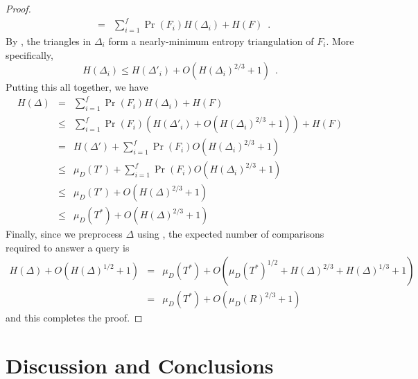 \documentclass[lotsofwhite]{patmorin}
\begin{document}
\begin{proof}
\begin{eqnarray*}
     & = & \sum_{i=1}^f \Pr(F_i) H(\Delta_i) + H(F) \enspace .
\end{eqnarray*}
By , the triangles in $\Delta_i$ form a
nearly-minimum entropy triangulation of $F_i$.  More specifically, 
\[  
   H(\Delta_i) \le H(\Delta'_i) + O(H(\Delta_i)^{2/3}+1)  \enspace .
\]
Putting this all together, we have
\begin{eqnarray*}
  H(\Delta) 
    &  =  & \sum_{i=1}^f\Pr(F_i) H(\Delta_i) + H(F) \\ 
    & \le & \sum_{i=1}^f\Pr(F_i) (H(\Delta'_i) + O(H(\Delta_i)^{2/3}+1)) + H(F) \\ 
    &  =  & H(\Delta') + \sum_{i=1}^f\Pr(F_i) O(H(\Delta_i)^{2/3}+1) \\ 
    & \le & \mu_D(T') + \sum_{i=1}^f\Pr(F_i) O(H(\Delta_i)^{2/3}+1) \\ 
    & \le & \mu_D(T') + O(H(\Delta)^{2/3}+1) \\
    & \le & \mu_D(T^*) + O(H(\Delta)^{2/3}+1)
\end{eqnarray*}
Finally, since we preprocess $\Delta$ using , the
expected number of comparisons required to answer a query is
\begin{eqnarray*}
  H(\Delta) + O(H(\Delta)^{1/2} + 1)
   & = & \mu_D(T^*) +  O(\mu_D(T^*)^{1/2} + H(\Delta)^{2/3} + H(\Delta)^{1/3} + 1) \\
   & = & \mu_D(T^*) + O(\mu_D(R)^{2/3} + 1)
\end{eqnarray*}
and this completes the proof.
\end{proof}

\section{Discussion and Conclusions}



\end{document}

